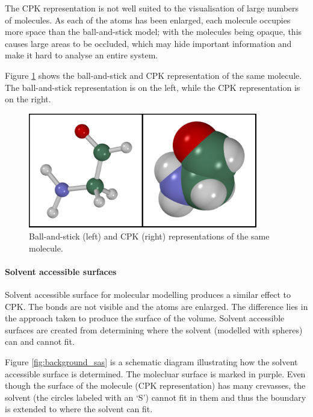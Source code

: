 The CPK representation is not well suited to the visualisation of large numbers
of molecules. As each of the atoms has been enlarged, each molecule occupies
more space than the ball-and-stick model; with the molecules being opaque, this
causes large areas to be occluded, which may hide important information and
make it hard to analyse an entire system.

Figure \ref{fig:background_ball_cpk} shows the ball-and-stick and CPK
representation of the same molecule. The ball-and-stick representation is on
the left, while the CPK representation is on the right.

\begin{figure}
  \begin{center}
    \includegraphics[width=100mm]{ball_cpk}
  \end{center}
  \caption{Ball-and-stick (left) and CPK (right) representations of the same
  molecule.}
  \label{fig:background_ball_cpk}
\end{figure}


\paragraph{Solvent accessible surfaces}

Solvent accessible surface for molecular modelling \citep{connolly83} produces
a similar effect to CPK. The bonds are not visible and the atoms are enlarged.
The difference lies in the approach taken to produce the surface of the volume.
Solvent accessible surfaces are created from determining where the solvent
(modelled with spheres) can and cannot fit.

Figure \ref{fig:background_sas} is a schematic diagram illustrating how the
solvent accessible surface is determined. The molecluar surface is marked in
purple. Even though the surface of the molecule (CPK representation) has many
crevasses, the solvent (the circles labeled with an `S') cannot fit in them and
thus the boundary is extended to where the solvent can fit.

